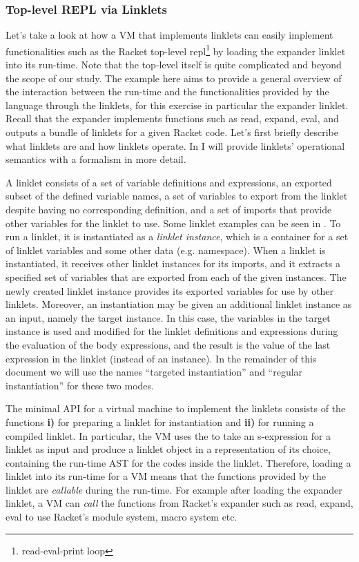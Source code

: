 \subsubsection{Top-level REPL via Linklets}
\label{subsec:toplevel-example}

Let's take a look at how a VM that implements linklets can easily
implement functionalities such as the Racket top-level
repl\footnote{read-eval-print loop} by loading the expander linklet
into its run-time. Note that the top-level itself is quite complicated
and beyond the scope of our study. The example here aims to provide a
general overview of the interaction between the run-time and the
functionalities provided by the language through the linklets, for
this exercise in particular the expander linklet. Recall that the
expander implements functions such as read, expand, eval, and outputs
a bundle of linklets for a given Racket code. Let's first briefly
describe what linklets are and how linklets
operate. In  I will provide
linklets' operational semantics with a formalism in more detail.

A linklet consists of a set of variable definitions and expressions,
an exported subset of the defined variable names, a set of variables
to export from the linklet despite having no corresponding definition,
and a set of imports that provide other variables for the linklet to
use. Some linklet examples can be seen in
. To run a linklet, it is
instantiated as a \emph{linklet instance}, which is a container for a
set of linklet variables and some other data (e.g. namespace). When a
linklet is instantiated, it receives other linklet instances for its
imports, and it extracts a specified set of variables that are
exported from each of the given instances. The newly created linklet
instance provides its exported variables for use by other
linklets. Moreover, an instantiation may be given an additional
linklet instance as an input, namely the target instance. In this
case, the variables in the target instance is used and modified for
the linklet definitions and expressions during the evaluation of the
body expressions, and the result is the value of the last expression
in the linklet (instead of an instance). In the remainder of this
document we will use the names ``targeted instantiation'' and
``regular instantiation'' for these two modes.

The minimal API for a virtual machine to implement the linklets
consists of the functions \textbf{i)}  for
preparing a linklet for instantiation and \textbf{ii)}
 for running a compiled linklet. In
particular, the VM uses the  to take an
s-expression for a linklet as input and produce a linklet object in a
representation of its choice, containing the run-time AST for the
codes inside the linklet. Therefore, loading a linklet into its
run-time for a VM means that the functions provided by the linklet are
\emph{callable} during the run-time. For example after loading the
expander linklet, a VM can \emph{call} the functions from Racket's
expander such as read, expand, eval to use Racket's module system,
macro system etc.


